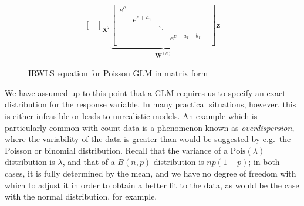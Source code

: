 \documentclass[a4paper]{book}
\begin{document}
\begin{figure}
\begin{displaymath}
\begin{split}
{\begin{bmatrix}
        \end{bmatrix}
        }_{\mathbf{X}^T}
        \underbrace{
          \begin{bmatrix}
          e^{c} & & & \\
          & e^{c + a_1} & & & \\
          & & \ddots & \\
          & & & e^{c + a_I + b_I} \\
        \end{bmatrix}
        }_{\mathbf{W}^{(k)}}
        \mathbf{z}
    \end{split}
  \end{displaymath}
  \caption{IRWLS equation for Poisson GLM in matrix form}
  \label{fig:glm-mat-eq}
\end{figure}

We have assumed up to this point that a GLM requires us to specify an exact distribution for the response variable. In many practical situations, however, this is either infeasible or leads to unrealistic models. An example which is particularly common with count data is a phenomenon known as \emph{overdispersion}, where the variability of the data is greater than would be suggested by e.g.\ the Poisson or binomial distribution. Recall that the variance of a $\mathrm{Pois}(\lambda)$ distribution is $\lambda$, and that of a $B(n, p)$ distribution is $np(1 - p)$; in both cases, it is fully determined by the mean, and we have no degree of freedom with which to adjust it in order to obtain a better fit to the data, as would be the case with the normal distribution, for example.
\end{document}
